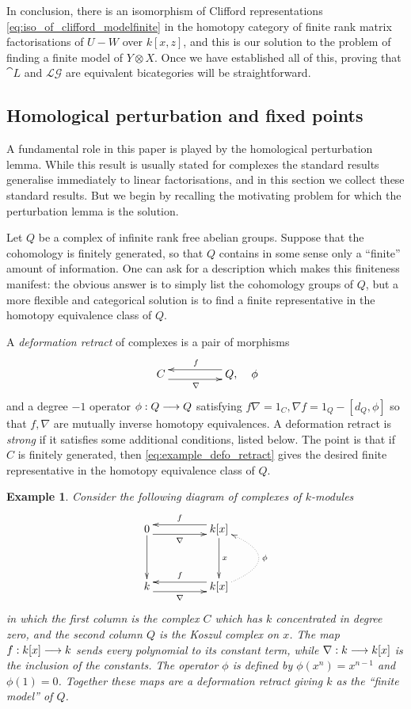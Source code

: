 \documentclass[english,letter paper,12pt,leqno]{article}
\theoremstyle{example}
\newtheorem{example}[theorem]{Example}
\numberwithin{equation}{section}
\def\LG{\mathcal{LG}}
\begin{document}
In conclusion, there is an isomorphism of Clifford representations \eqref{eq:iso_of_clifford_modelfinite} in the homotopy category of finite rank matrix factorisations of $U - W$ over $k[x,z]$, and this is our solution to the problem of finding a finite model of $Y \otimes X$. Once we have established all of this, proving that $\cat{L}$ and $\LG$ are equivalent bicategories will be straightforward.

\subsection{Homological perturbation and fixed points}\label{section:homolog_fix}

A fundamental role in this paper is played by the homological perturbation lemma. While this result is usually stated for complexes the standard results generalise immediately to linear factorisations, and in this section we collect these standard results. But we begin by recalling the motivating problem for which the perturbation lemma is the solution.

Let $Q$ be a complex of infinite rank free abelian groups. Suppose that the cohomology is finitely generated, so that $Q$ contains in some sense only a ``finite'' amount of information. One can ask for a description which makes this finiteness manifest: the obvious answer is to simply list the cohomology groups of $Q$, but a more flexible and categorical solution is to find a finite representative in the homotopy equivalence class of $Q$.

A \emph{deformation retract} of complexes is a pair of morphisms
\begin{equation}\label{eq:example_defo_retract}
\xymatrix@C+2pc{
C \ar@<-1ex>[r]_\nabla & Q, \ar@<-1ex>[l]_f
} \quad \phi
\end{equation}
and a degree $-1$ operator $\phi: Q \longrightarrow Q$ satisfying $f \nabla = 1_C, \nabla f = 1_Q - [d_Q, \phi]$ so that $f, \nabla$ are mutually inverse homotopy equivalences. A deformation retract is \emph{strong} if it satisfies some additional conditions, listed below. The point is that if $C$ is finitely generated, then \eqref{eq:example_defo_retract} gives the desired finite representative in the homotopy equivalence class of $Q$. 

\begin{example}\label{example:koszulsplit} Consider the following diagram of complexes of $k$-modules
\[
\xymatrix@C+2pc@R+1pc{
0 \ar[d] \ar@<-1ex>[r]_-{\nabla} & k[x] \ar@<-1ex>[l]_-{f} \ar[d]^-{x}\\
k \ar@<-1ex>[r]_-{\nabla} & k[x] \ar@<-1ex>[l]_-{f} \ar@/_3pc/@{.>}[u]_-{\phi}
}
\]
in which the first column is the complex $C$ which has $k$ concentrated in degree zero, and the second column $Q$ is the Koszul complex on $x$. The map $f: k[x] \longrightarrow k$ sends every polynomial to its constant term, while $\nabla: k \longrightarrow k[x]$ is the inclusion of the constants. The operator $\phi$ is defined by $\phi( x^n ) = x^{n-1}$ and $\phi(1) = 0$. Together these maps are a deformation retract giving $k$ as the ``finite model'' of $Q$.
\end{example}
\end{document}
